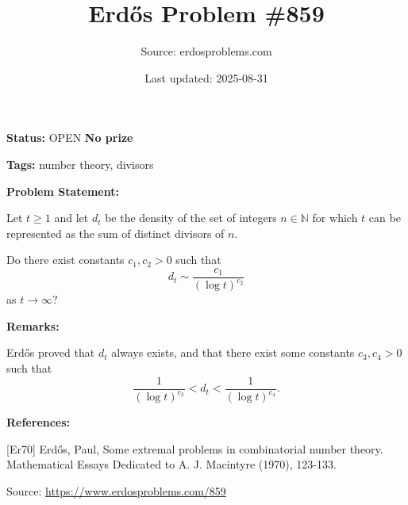 \documentclass{article}
\title{Erd\H{o}s Problem \#859}
\date{Last updated: 2025-08-31}
\author{Source: erdosproblems.com}
\begin{document}
\maketitle

\noindent\textbf{Status:} OPEN \quad \textbf{No prize}

\noindent\textbf{Tags:} number theory, divisors

\medskip
\noindent\textbf{Problem Statement:}

Let $t\geq 1$ and let $d_t$ be the density of the set of integers $n\in\mathbb{N}$ for which $t$ can be represented as the sum of distinct divisors of $n$.

Do there exist constants $c_1,c_2>0$ such that\[d_t \sim \frac{c_1}{(\log t)^{c_2}}\]as $t\to \infty$?

\bigskip
\noindent\textbf{Remarks:}

Erd\H{o}s \cite{Er70} proved that $d_t$ always exists, and that there exist some constants $c_3,c_4>0$ such that\[\frac{1}{(\log t)^{c_3}} < d_t < \frac{1}{(\log t)^{c_4}}.\]

\bigskip
\noindent\textbf{References:}

[Er70] Erd\H{o}s, Paul, Some extremal problems in combinatorial number theory. Mathematical Essays Dedicated to A. J. Macintyre (1970), 123-133.

\bigskip
\noindent\small{Source: \url{https://www.erdosproblems.com/859}}
\end{document}
